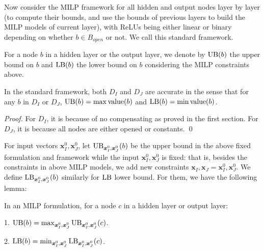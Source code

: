 			Now consider the MILP framework for all hidden and output nodes layer by layer (to compute their bounds, and use the bounds of previous layers to build the MILP models of current layer), with ReLUs being either linear or binary depending on whether $b \in B_{open}$ or not. We call this standard framework.
			
			For a node $b$ in a hidden layer or the output layer, we denote by $\mathrm{UB}(b)$ the upper bound on $b$ and $\mathrm{LB}(b)$ the lower bound on $b$ considering the MILP constraints above.
			
			
			\begin{lemma}
				In the standard framework, both $D_I$ and $D_J$ are accurate in the sense that for any $b$ in $D_I$ or $D_J$, $\mathrm{UB}(b)=\max{\textrm{value}}(b)$ and $\mathrm{LB}(b)=\min{\textrm{value}}(b)$.
			\end{lemma}
			
			\begin{proof}
				For $D_I$, it is because of no compensating as proved in the first section. For $D_J$, it is because all nodes are either opened or constants. \qed
			\end{proof}
			
			
			
			
			For input vectors $\boldsymbol{x}^0_I,\boldsymbol{x}^0_J$, let $\mathrm{UB}_{\boldsymbol{x}^0_I,\boldsymbol{x}^0_J}(b)$ be the upper bound in the above fixed formulation and framework while the input $\boldsymbol{x}^0_I,\boldsymbol{x}^0_J$ is fixed: that is, besides the constraints in above MILP models, we add new constraints $\boldsymbol{x}_I,\boldsymbol{x}_J=\boldsymbol{x}^0_I,\boldsymbol{x}^0_J$. We  define $\mathrm{LB}_{\boldsymbol{x}^0_I,\boldsymbol{x}^0_J}(b)$ similarly for $\mathrm{LB}$ lower bound. For them, we have the following lemma:
			
			\begin{lemma} In an MILP formulation, for a node $c$ in a hidden layer or output layer:
				
				1. $\mathrm{UB}(b)=\max_{\boldsymbol{x}^0_I,\boldsymbol{x}^0_J}\mathrm{UB}_{\boldsymbol{x}^0_I,\boldsymbol{x}^0_J}(c)$. 
				
				2. $\mathrm{LB}(b)=\min_{\boldsymbol{x}^0_I,\boldsymbol{x}^0_J}\mathrm{LB}_{\boldsymbol{x}^0_I,\boldsymbol{x}^0_J}(c)$. 
			\end{lemma}
			
